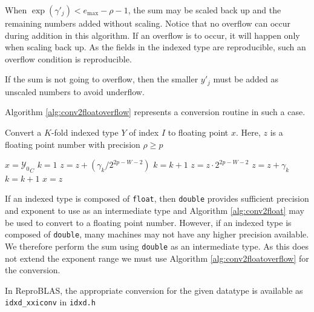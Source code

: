     When $\exp(\gamma'_j) < e_{\max} - \rho - 1$, the sum may be scaled back up
    and the remaining numbers added without scaling. Notice that no overflow
    can occur during addition in this algorithm. If an overflow is to occur, it
    will happen only when scaling back up. As the fields in the indexed type
    are reproducible, such an overflow condition is reproducible.

    If the sum is not going to overflow, then the smaller $y'_j$ must be added
    as unscaled numbers to avoid underflow.

    Algorithm \ref{alg:conv2floatoverflow} represents a conversion routine in such a case.

    \begin{samepage}
    \begin{alg}
      Convert a $K$-fold indexed type $Y$ of index $I$ to floating point $x$.
      Here, $z$ is a floating point number with precision $\rho \geq p$
      \begin{algorithmic}[1]
            \State $x = {\mathcal{Y}_0}_C$
            \State \Return
          \EndIf
          \State $k = 1$
            \State $z = z + (\gamma_k / 2^{2 p - W - 2})$
            \State $k = k + 1$
          \EndWhile
          \State $z = z \cdot 2^{2 p - W - 2}$
            \State $z = z + \gamma_k$
            \State $k = k + 1$
          \EndWhile
          \State $x = z$
        \EndFunction
      \end{algorithmic}
      \label{alg:conv2floatoverflow}
    \end{alg}
    \end{samepage}

    If an indexed type is composed of \texttt{float}, then \texttt{double}
    provides sufficient precision and exponent to use as an intermediate type
    and Algorithm \ref{alg:conv2float} may be used to convert to a floating
    point number.  However, if an indexed type is composed of \texttt{double},
    many machines may not have any higher precision available. We therefore
    perform the sum using \texttt{double} as an intermediate type. As this does
    not extend the exponent range we must use Algorithm
    \ref{alg:conv2floatoverflow} for the conversion.

    In ReproBLAS, the appropriate conversion for the given datatype is available as \texttt{idxd\_xxiconv} in \texttt{idxd.h}
